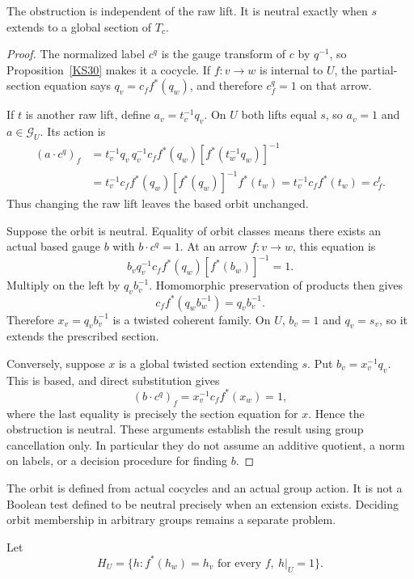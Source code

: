 \begin{theorem}\label{KS31}
The obstruction is independent of the raw lift. It is neutral exactly when \(s\) extends to a global section of \(T_c\).
\end{theorem}
\begin{proof}
The normalized label $c^q$ is the gauge transform of $c$ by $q^{-1}$, so Proposition~\ref{KS30} makes it a cocycle. If $f:v\to w$ is internal to $U$, the partial-section equation says $q_v=c_ff^*(q_w)$, and therefore $c_f^q=1$ on that arrow.

If $t$ is another raw lift, define $a_v=t_v^{-1}q_v$. On $U$ both lifts equal $s$, so $a_v=1$ and $a\in\mathcal G_U$. Its action is
\[
\begin{aligned}
 (a\cdot c^q)_f
 &=t_v^{-1}q_v\,q_v^{-1}c_ff^*(q_w)
       [f^*(t_w^{-1}q_w)]^{-1}\\
 &=t_v^{-1}c_ff^*(q_w)
       [f^*(q_w)]^{-1}f^*(t_w)
 =t_v^{-1}c_ff^*(t_w)=c_f^t.
\end{aligned}
\]
Thus changing the raw lift leaves the based orbit unchanged.

Suppose the orbit is neutral. Equality of orbit classes means there exists an actual based gauge $b$ with $b\cdot c^q=1$. At an arrow $f:v\to w$, this equation is
\[
 b_vq_v^{-1}c_ff^*(q_w)[f^*(b_w)]^{-1}=1.
\]
Multiply on the left by $q_vb_v^{-1}$. Homomorphic preservation of products then gives
\[
 c_ff^*(q_wb_w^{-1})=q_vb_v^{-1}.
\]
Therefore $x_v=q_vb_v^{-1}$ is a twisted coherent family. On $U$, $b_v=1$ and $q_v=s_v$, so it extends the prescribed section.

Conversely, suppose $x$ is a global twisted section extending $s$. Put $b_v=x_v^{-1}q_v$. This is based, and direct substitution gives
\[
 (b\cdot c^q)_f
 =x_v^{-1}c_ff^*(x_w)=1,
\]
where the last equality is precisely the section equation for $x$. Hence the obstruction is neutral. These arguments establish the result using group cancellation only. In particular they do not assume an additive quotient, a norm on labels, or a decision procedure for finding $b$.
\end{proof}
The orbit is defined from actual cocycles and an actual group action. It is not a Boolean test defined to be neutral precisely when an extension exists. Deciding orbit membership in arbitrary groups remains a separate problem.

Let
\[
 H_U=\{h:f^*(h_w)=h_v\text{ for every }f,\ h|_U=1\}.
\]

